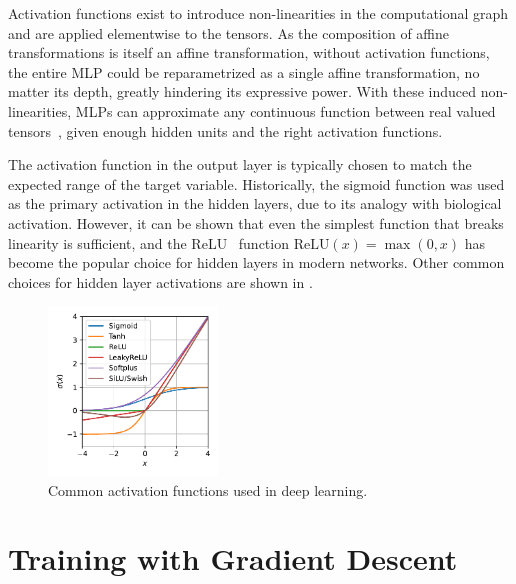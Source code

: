 Activation functions exist to introduce non-linearities in the computational graph and are applied elementwise to the tensors.
As the composition of affine transformations is itself an affine transformation, without activation functions, the entire MLP could be reparametrized as a single affine transformation, no matter its depth, greatly hindering its expressive power.
With these induced non-linearities, MLPs can approximate any continuous function between real valued tensors~\cite{ApproximationSuperpositionsSigmoidal, ApproximatingContinuousFunctions, UniversalApproximationDeep}, given enough hidden units and the right activation functions.

The activation function in the output layer is typically chosen to match the expected range of the target variable.
Historically, the sigmoid function was used as the primary activation in the hidden layers, due to its analogy with biological activation.
However, it can be shown that even the simplest function that breaks linearity is sufficient, and the ReLU~\cite{ReLU} function $\text{ReLU}(x) = \max(0, x)$ has become the popular choice for hidden layers in modern networks.
Other common choices for hidden layer activations are shown in .

\begin{figure}
    \centering
    \includegraphics[width=0.4\textwidth]{Figures/deep_learning/activations.pdf}
    \caption{Common activation functions used in deep learning.}
    \label{fig:activations}
\end{figure}

\section{Training with Gradient Descent}


